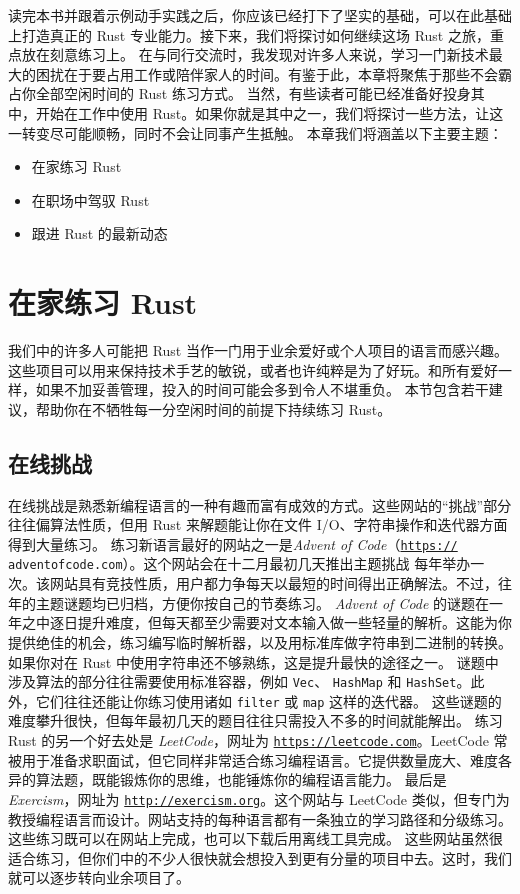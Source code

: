 读完本书并跟着示例动手实践之后，你应该已经打下了坚实的基础，可以在此基础上打造真正的 Rust 专业能力。接下来，我们将探讨如何继续这场 Rust 之旅，重点放在刻意练习上。
在与同行交流时，我发现对许多人来说，学习一门新技术最大的困扰在于要占用工作或陪伴家人的时间。有鉴于此，本章将聚焦于那些不会霸占你全部空闲时间的 Rust 练习方式。
当然，有些读者可能已经准备好投身其中，开始在工作中使用 Rust。如果你就是其中之一，我们将探讨一些方法，让这一转变尽可能顺畅，同时不会让同事产生抵触。
本章我们将涵盖以下主要主题：
\begin{itemize}
  \item 在家练习 Rust
  \item 在职场中驾驭 Rust
  \item 跟进 Rust 的最新动态
\end{itemize}
\section{在家练习 Rust}
\label{idx:idx_33db39ad}
我们中的许多人可能把 Rust 当作一门用于业余爱好或个人项目的语言而感兴趣。这些项目可以用来保持技术手艺的敏锐，或者也许纯粹是为了好玩。和所有爱好一样，如果不加妥善管理，投入的时间可能会多到令人不堪重负。
本节包含若干建议，帮助你在不牺牲每一分空闲时间的前提下持续练习 Rust。
\subsection{在线挑战}
\label{idx:idx_a77a6702}
在线挑战是熟悉新编程语言的一种有趣而富有成效的方式。这些网站的“挑战”部分往往偏算法性质，但用 Rust 来解题能让你在文件 I/\allowbreak{}O、字符串操作和迭代器方面得到大量练习。
练习新语言最好的网站之一是\emph{Advent of Code}（\href{https://}{\texttt{https://}}
\label{idx:idx_dabffd2d}
\texttt{adventofcode.\allowbreak{}com}）。这个网站会在十二月最初几天推出主题挑战
每年举办一次。该网站具有竞技性质，用户都力争每天以最短的时间得出正确解法。不过，往年的主题谜题均已归档，方便你按自己的节奏练习。
\emph{Advent of Code} 的谜题在一年之中逐日提升难度，但每天都至少需要对文本输入做一些轻量的解析。这能为你提供绝佳的机会，练习编写临时解析器，以及用标准库做字符串到二进制的转换。如果你对在 Rust 中使用字符串还不够熟练，这是提升最快的途径之一。
谜题中涉及算法的部分往往需要使用标准容器，例如 \texttt{Vec}、
\texttt{HashMap} 和 \texttt{HashSet}。此外，它们往往还能让你练习使用诸如 \texttt{filter} 或 \texttt{map} 这样的迭代器。
这些谜题的难度攀升很快，但每年最初几天的题目往往只需投入不多的时间就能解出。
\label{idx:idx_0758810c}
练习 Rust 的另一个好去处是 \emph{LeetCode}，网址为 \href{https://leetcode.com}{\texttt{https:/\allowbreak{}/\allowbreak{}leetcode.\allowbreak{}com}}。LeetCode 常被用于准备求职面试，但它同样非常适合练习编程语言。它提供数量庞大、难度各异的算法题，既能锻炼你的思维，也能锤炼你的编程语言能力。
\label{idx:idx_20141f0d}
最后是 \emph{Exercism}，网址为 \href{http://exercism.org}{\texttt{http:/\allowbreak{}/\allowbreak{}exercism.\allowbreak{}org}}。这个网站与 LeetCode 类似，但专门为教授编程语言而设计。网站支持的每种语言都有一条独立的学习路径和分级练习。这些练习既可以在网站上完成，也可以下载后用离线工具完成。
\label{idx:idx_3f3d4080}
这些网站虽然很适合练习，但你们中的不少人很快就会想投入到更有分量的项目中去。这时，我们就可以逐步转向业余项目了。
